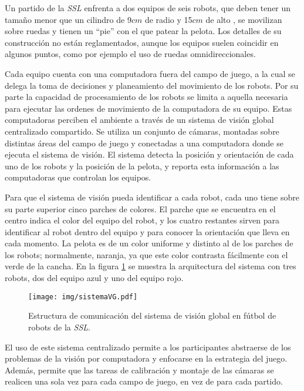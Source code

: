 Un partido de la \emph{SSL} enfrenta a dos equipos de seis robots, que deben
tener un tamaño menor que un cilindro de 9$cm$ de radio y 15$cm$ de alto
\cite{sslrules2015}, se movilizan sobre ruedas y tienen un ``pie'' con el que
patear la pelota. Los detalles de su construcción no están reglamentados,
aunque los equipos suelen coincidir en algunos puntos, como por ejemplo el uso
de ruedas omnidireccionales.

Cada equipo cuenta con una computadora fuera del campo de juego, a la cual se
delega la toma de decisiones y planeamiento del movimiento de los robots. Por
su parte la capacidad de procesamiento de los robots se limita a aquella
necesaria para ejecutar las ordenes de movimiento de la computadora de su
equipo. Estas computadoras perciben el ambiente a través de un sistema de
visión global centralizado compartido. Se utiliza un conjunto de cámaras,
montadas sobre distintas áreas del campo de juego y conectadas a una
computadora donde se ejecuta el sistema de visión. El sistema detecta la
posición y orientación de cada uno de los robots y la posición de la pelota, y
reporta esta información a las computadoras que controlan los equipos.

Para que el sistema de visión pueda identificar a cada robot, cada uno tiene
sobre su parte superior cinco parches de colores. El parche que se encuentra
en el centro indica el color del equipo del robot, y los cuatro restantes
sirven para identificar al robot dentro del equipo y para conocer la
orientación que lleva en cada momento. La pelota es de un color uniforme y
distinto al de los parches de los robots; normalmente, naranja, ya que este
color contrasta fácilmente con el verde de la cancha. En la figura
\ref{sistemaVG} se muestra la arquitectura del sistema con tres robots, dos
del equipo azul y uno del equipo rojo.

\begin{figure}[!h]

	\texttt{[image: img/sistemaVG.pdf]}

	\caption{Estructura de comunicación del sistema de visión global en
	fútbol de robots de la \emph{SSL}.}

	\label{sistemaVG}

\end{figure}

El uso de este sistema centralizado permite a los participantes abstraerse de
los problemas de la visión por computadora y enfocarse en la estrategia del
juego. Además, permite que las tareas de calibración y montaje de las cámaras se
realicen una sola vez para cada campo de juego, en vez de para cada partido.

